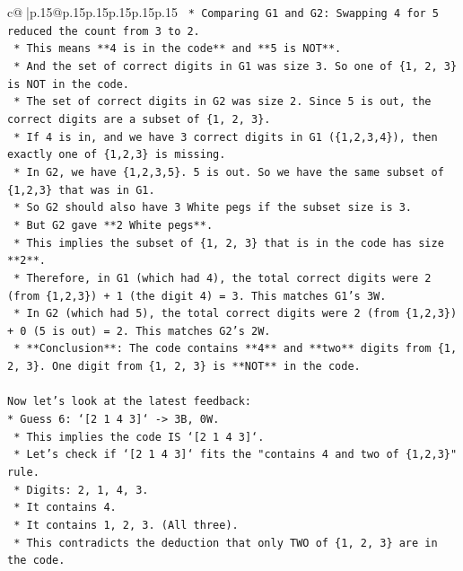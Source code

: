 \documentclass{article}
\begin{document}
{\begin{supertabular}{c@{$\;$}|p{.15\linewidth}@{}p{.15\linewidth}p{.15\linewidth}p{.15\linewidth}p{.15\linewidth}p{.15\linewidth}}
{{{\texttt{    *   Comparing G1 and G2: Swapping 4 for 5 reduced the count from 3 to 2.} \\
\texttt{    *   This means **4 is in the code** and **5 is NOT**.} \\
\texttt{    *   And the set of correct digits in G1 was size 3. So one of \{1, 2, 3\} is NOT in the code.} \\
\texttt{    *   The set of correct digits in G2 was size 2. Since 5 is out, the correct digits are a subset of \{1, 2, 3\}.} \\
\texttt{    *   If 4 is in, and we have 3 correct digits in G1 (\{1,2,3,4\}), then exactly one of \{1,2,3\} is missing.} \\
\texttt{    *   In G2, we have \{1,2,3,5\}. 5 is out. So we have the same subset of \{1,2,3\} that was in G1.} \\
\texttt{    *   So G2 should also have 3 White pegs if the subset size is 3.} \\
\texttt{    *   But G2 gave **2 White pegs**.} \\
\texttt{    *   This implies the subset of \{1, 2, 3\} that is in the code has size **2**.} \\
\texttt{    *   Therefore, in G1 (which had 4), the total correct digits were 2 (from \{1,2,3\}) + 1 (the digit 4) = 3. This matches G1's 3W.} \\
\texttt{    *   In G2 (which had 5), the total correct digits were 2 (from \{1,2,3\}) + 0 (5 is out) = 2. This matches G2's 2W.} \\
\texttt{    *   **Conclusion**: The code contains **4** and **two** digits from \{1, 2, 3\}. One digit from \{1, 2, 3\} is **NOT** in the code.} \\
\\ 
\texttt{Now let's look at the latest feedback:} \\
\texttt{*   Guess 6: `{[}2 1 4 3{]}` {-}> 3B, 0W.} \\
\texttt{    *   This implies the code IS `{[}2 1 4 3{]}`.} \\
\texttt{    *   Let's check if `{[}2 1 4 3{]}` fits the "contains 4 and two of \{1,2,3\}" rule.} \\
\texttt{    *   Digits: 2, 1, 4, 3.} \\
\texttt{    *   It contains 4.} \\
\texttt{    *   It contains 1, 2, 3. (All three).} \\
\texttt{    *   This contradicts the deduction that only TWO of \{1, 2, 3\} are in the code.} \\
}}}
\end{supertabular}}
\end{document}
